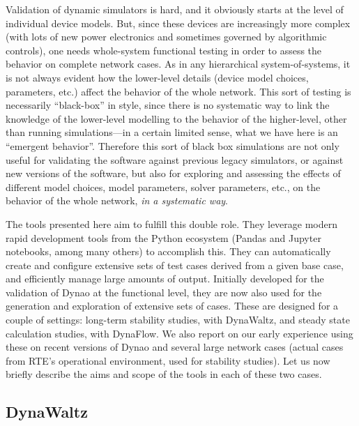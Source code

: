 \documentclass[conference]{IEEEtran}
\newcommand{\Dynawo}{Dyna\textomega o} %
\begin{document}

Validation of dynamic simulators is hard, and it obviously starts at the level
of individual device models. But, since these devices are increasingly more
complex (with lots of new power electronics and sometimes governed by
algorithmic controls), one needs whole-system functional testing in order to
assess the behavior on complete network cases. As in any hierarchical
system-of-systems, it is not always evident how the lower-level details (device
model choices, parameters, etc.)  affect the behavior of the whole network. This
sort of testing is necessarily ``black-box'' in style, since there is no
systematic way to link the knowledge of the lower-level modelling to the behavior
of the higher-level, other than running simulations---in a certain limited
sense, what we have here is an ``emergent behavior''.  Therefore this sort of
black box simulations are not only useful for validating the software against
previous legacy simulators, or against new versions of the software, but also
for exploring and assessing the effects of different model choices, model
parameters, solver parameters, etc., on the behavior of the whole network,
\emph{in a systematic way}.

The tools presented here aim to fulfill this double role. They leverage modern
rapid development tools from the Python ecosystem (Pandas and Jupyter notebooks,
among many others) to accomplish this. They can automatically create and
configure extensive sets of test cases derived from a given base case, and
efficiently manage large amounts of output. Initially developed for the
validation of \Dynawo{} at the functional level, they are now also used for the
generation and exploration of extensive sets of cases. These are designed for a
couple of settings: long-term stability studies, with DynaWaltz, and steady state calculation studies, with DynaFlow. We also
report on our early experience using these on recent versions of \Dynawo{} and
several large network cases (actual cases from RTE's operational environment,
used for stability studies). Let us now briefly describe the aims and scope of
the tools in each of these two cases.



\subsection{DynaWaltz}
\end{document}
